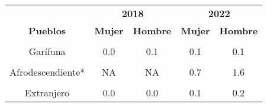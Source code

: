 \begin{tabular}[t]{ccccc}
\toprule
\multicolumn{1}{c}{\textbf{ }} & \multicolumn{2}{c}{\textbf{2018}} & \multicolumn{2}{c}{\textbf{2022}} \\
\cmidrule(l{3pt}r{3pt}){2-3} \cmidrule(l{3pt}r{3pt}){4-5}
\textbf{Pueblos} & \textbf{Mujer} & \textbf{Hombre} & \textbf{Mujer} & \textbf{Hombre}\\
\midrule
\cellcolor[HTML]{B6B3FF}{Maya} & \cellcolor[HTML]{B6B3FF}{10.7} & \cellcolor[HTML]{B6B3FF}{23.5} & \cellcolor[HTML]{B6B3FF}{11.6} & \cellcolor[HTML]{B6B3FF}{22.5}\\
Garífuna & 0.0 & 0.1 & 0.1 & 0.1\\
\cellcolor[HTML]{B6B3FF}{Xinka} & \cellcolor[HTML]{B6B3FF}{0.4} & \cellcolor[HTML]{B6B3FF}{1.4} & \cellcolor[HTML]{B6B3FF}{0.4} & \cellcolor[HTML]{B6B3FF}{0.8}\\
Afrodescendiente* & NA & NA & 0.7 & 1.6\\
\cellcolor[HTML]{B6B3FF}{Ladino} & \cellcolor[HTML]{B6B3FF}{22.8} & \cellcolor[HTML]{B6B3FF}{41.1} & \cellcolor[HTML]{B6B3FF}{24.8} & \cellcolor[HTML]{B6B3FF}{37.2}\\
Extranjero & 0.0 & 0.0 & 0.1 & 0.2\\
\bottomrule
\end{tabular}
